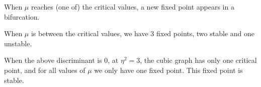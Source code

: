 \documentclass[a4paper,11pt,pdftex]{article}
\begin{document}
When $\mu$ reaches (one of) the critical values, a new fixed point appears in a bifurcation.

When $\mu$ is between the critical values, we have 3 fixed points, two stable and one unstable. 

When the above discriminant is 0, at $\eta^2 = 3$,  the cubic graph has only one critical point, and for all values of $\mu$ we only have one fixed point. This fixed point is stable. 
\end{document}
